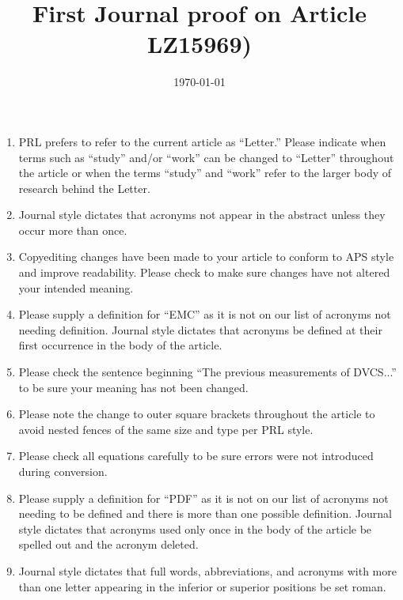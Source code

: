 \documentclass[a4paper,11pt,twoside]{article}
\title{First Journal proof on Article LZ15969)}
\date{\today}
\begin{document}
\maketitle


\begin{enumerate}
   \item  PRL prefers to refer to the current article as ``Letter.'' Please 
      indicate when terms such as ``study'' and/or ``work'' can be changed to 
      ``Letter'' throughout the article or when the terms ``study'' and 
      ``work'' refer to the larger body of research behind the Letter.

      
   \item Journal style dictates that acronyms not appear in the abstract unless 
   they occur more than once.

     
\item Copyediting changes have been made to your article to conform to APS 
   style and improve readability. Please check to make sure changes have not 
      altered your intended meaning.

\item Please supply a definition for ``EMC'' as it is not on our list of 
   acronyms not needing definition. Journal style dictates that acronyms be 
      defined at their first occurrence in the body of the article.
      
   \item Please check the sentence beginning ``The previous measurements of 
      DVCS...'' to be sure your meaning has not been changed.

\item Please note the change to outer square brackets throughout the article to 
   avoid nested fences of the same size and type per PRL style.

      \item Please check all equations carefully to be sure errors were not 
         introduced during conversion.

      \item Please supply a definition for ``PDF'' as it is not on our list of 
         acronyms not needing to be defined and there is more than one possible 
         definition. Journal style dictates that acronyms used only once in the 
         body of the article be spelled out and the acronym deleted.
         
         
\item Journal style dictates that full words, abbreviations, and acronyms with 
   more than one letter appearing in the inferior or superior positions be set 
      roman.


\end{enumerate}
\end{document}
